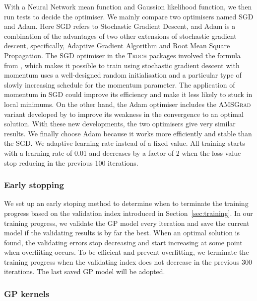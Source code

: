 With a Neural Network mean function and Gaussion likelihood function, we then run tests to decide the optimiser. We mainly compare two optimisers named SGD and Adam. Here SGD refers to Stochastic Gradient Descent, and Adam is a combination of the advantages of two other extensions of stochastic gradient descent, specifically, Adaptive Gradient Algorithm and Root Mean Square Propagation. 
%
The SGD optimiser in the \textsc{Troch} packages involved the formula from \citet{sutskever2013importance}, which makes it possible to train using stochastic gradient descent with momentum uses a well-designed random initialisation and a particular type of slowly increasing schedule for the momentum parameter. The application of momentum in SGD could improve its efficiency and make it less likely to stuck in local minimums. On the other hand, the Adam optimiser includes the \textsc{AMSGrad} variant developed by \citet{47409} to improve its weakness in the convergence to an optimal solution. With these new developments, the two optimisers give very similar results. We finally choose Adam because it works more efficiently and stable than the SGD.  
%
We adaptive learning rate instead of a fixed value. All training starts with a learning rate of 0.01 and decreases by a factor of 2 when the loss value stop reducing in the previous 100 iterations.    

\subsubsection{Early stopping}
We set up an early stoping method to determine when to terminate the training progress based on the validation index introduced in Section~\ref{sec:training}. In our training progress, we validate the GP model every iteration and save the current model if the validating results is by far the best. When an optimal solution is found, the validating errors stop decreasing and start increasing at some point when overfiiting occurs. To be efficient and prevent overfitting, we terminate the training progress when the validating index does not decrease in the previous 300 iterations. The last saved GP model will be adopted.   

\subsubsection{GP kernels}

